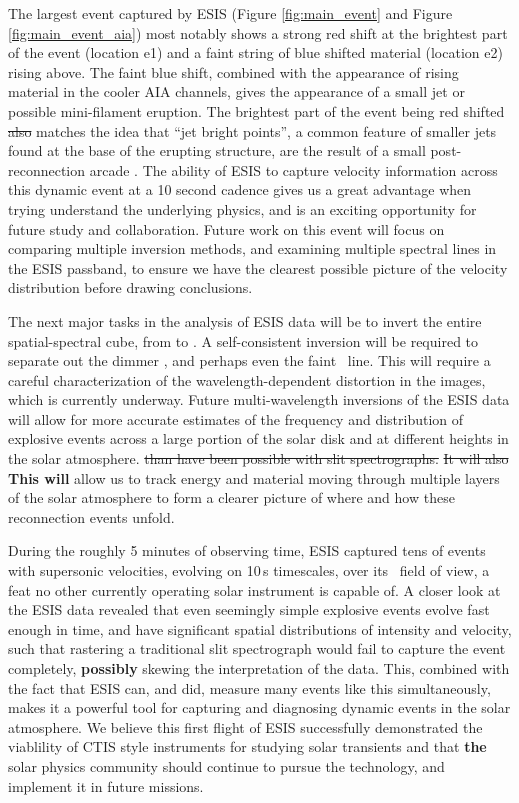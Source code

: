	The largest event captured by ESIS (Figure \ref{fig:main_event} and Figure \ref{fig:main_event_aia}) most notably shows a strong red shift at the brightest part of the event (location e1) and a faint string of blue shifted material (location e2) rising above.
	The faint blue shift, combined with the appearance of rising material in the cooler AIA channels, gives the appearance of a small jet or possible mini-filament eruption.
	The brightest part of the event being red shifted \sout{also} matches the idea that ``jet bright points'', a common feature of smaller jets found at the base of the erupting structure, are the result of a small post-reconnection arcade \citep[see][and references therein]{Sterling2015}.
	The ability of ESIS to capture velocity information across this dynamic event at a 10 second cadence gives us a great advantage when trying understand the underlying physics, and is an exciting opportunity for future study and collaboration.
	Future work on this event will focus on comparing multiple inversion methods, and examining multiple spectral lines in the ESIS passband, to ensure we have the clearest possible picture of the velocity distribution before drawing conclusions.
	
	The next major tasks in the analysis of ESIS data will be to invert the entire spatial-spectral cube, from  to . 
	A self-consistent inversion will be required to separate out the dimmer \mgxdim, and perhaps even the faint \oiii \ line. This will require a careful characterization of the wavelength-dependent distortion in the images, which is currently underway.
	Future multi-wavelength inversions of the ESIS data will allow for more accurate estimates of the frequency and distribution of explosive events across a large portion of the solar disk and at different heights in the solar atmosphere. \sout{ than have been possible with slit spectrographs.}
	\sout{It will also} \textbf{This will} allow us to track energy and material moving through multiple layers of the solar atmosphere to form a clearer picture of where and how these reconnection events unfold. 
	
	During the roughly 5 minutes of observing time, ESIS captured tens of events with supersonic velocities, evolving on 10\,s timescales, over its \esisfov \ field of view, a feat no other currently operating solar instrument is capable of.
	A closer look at the ESIS data revealed that even seemingly simple explosive events evolve fast enough in time, and have significant spatial distributions of intensity and velocity, such that rastering a traditional slit spectrograph would fail to capture the event completely, \textbf{possibly} skewing the interpretation of the data. 
	This, combined with the fact that ESIS can, and did, measure many events like this simultaneously, makes it a powerful tool for capturing and diagnosing dynamic events in the solar atmosphere.
	We believe this first flight of ESIS successfully demonstrated the viablility of CTIS style instruments for studying solar transients and that \textbf{the} solar physics community should continue to pursue the technology, and implement it in future missions. 
	
	
	

	  

